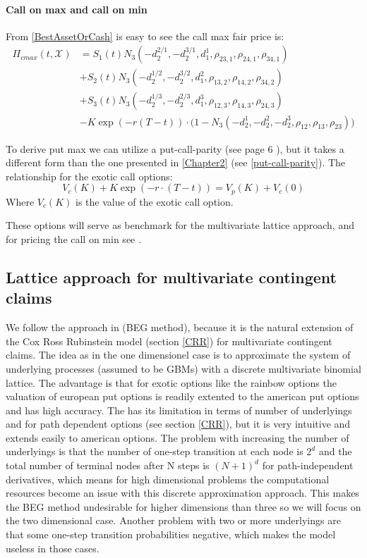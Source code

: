 \paragraph{Call on max and call on min}
From \eqref{BestAssetOrCash} is easy to see the call max fair price is:
\begin{equation}\label{callMax}
\begin{split}
\Pi_{cmax}(t,\mathcal{X})&=S_1(t) N_3(-d_2^{2/1},-d_2^{3/1},d_1^{1}, \rho_{23,1}, \rho_{24,1}, \rho_{34,1}) \\
&+S_2(t) N_3(-d_2^{1/2},-d_2^{3/2},d_1^{2}, \rho_{13,2}, \rho_{14,2}, \rho_{34,2})\\
&+S_3(t) N_3(-d_2^{1/3},-d_2^{2/3},d_1^{3}, \rho_{12,3}, \rho_{14,3}, \rho_{24,3}) \\
&-K \exp(-r(T-t)) \cdot\bigg(1 - N_3(-d_2^1,-d_2^2,-d_2^3, \rho_{12}, \rho_{13}, \rho_{23})\bigg)
\end{split}
\end{equation}

To derive put max we can utilize a put-call-parity (see page 6 \parencite{Ouwehand2006}), but it takes a different form than the one presented in \ref{Chapter2} (see \ref{put-call-parity}). The relationship for the exotic call options:
$$V_c(K)+K\exp(-r\cdot (T-t)) = V_p(K)+V_c(0)$$
Where $V_c(K)$ is the value of the exotic call option.

These options will serve as benchmark for the multivariate lattice approach, and for pricing the call on min see \parencite{Ouwehand2006}.


\subsection{Lattice approach for multivariate contingent claims}
We follow the approach in \parencite{BEG} (BEG method), because it is the natural extension of the Cox Ross Rubinstein model (section \ref{CRR}) for multivariate contingent claims. The idea as in the one dimensionel case is to approximate the system of underlying processes (assumed to be GBMs) with a discrete multivariate binomial lattice. The advantage is that for exotic options like the rainbow options the valuation of european put options is readily extented to the american put options and has high accuracy. The \parencite{BEG} has its limitation in terms of number of underlyings and for path dependent options (see section \ref{CRR}), but it is very intuitive and extends easily to american options. The problem with increasing the number of underlyings is that the number of one-step transition at each node is $2^d$ and the total number of terminal nodes after N steps is $(N+1)^d$ for path-independent derivatives, which means for high dimensional problems the computational resources become an issue with this discrete approximation approach. This makes the BEG method undesirable for higher dimensions than three so we will focus on the two dimensional case. Another problem with two or more underlyings are that some one-step transition probabilities negative, which makes the model useless in those cases. \\

